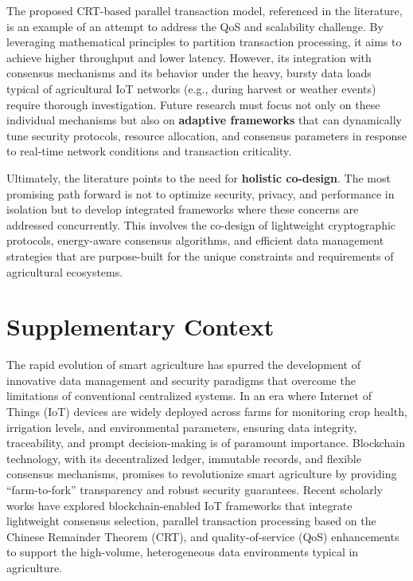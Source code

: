 \documentclass[12pt,onecolumn]{IEEEtran} %
\begin{document}
The proposed CRT-based parallel transaction model, referenced in the literature, is an example of an attempt to address the QoS and scalability challenge. By leveraging mathematical principles to partition transaction processing, it aims to achieve higher throughput and lower latency. However, its integration with consensus mechanisms and its behavior under the heavy, bursty data loads typical of agricultural IoT networks (e.g., during harvest or weather events) require thorough investigation. Future research must focus not only on these individual mechanisms but also on \textbf{adaptive frameworks} that can dynamically tune security protocols, resource allocation, and consensus parameters in response to real-time network conditions and transaction criticality.

Ultimately, the literature points to the need for \textbf{holistic co-design}. The most promising path forward is not to optimize security, privacy, and performance in isolation but to develop integrated frameworks where these concerns are addressed concurrently. This involves the co-design of lightweight cryptographic protocols, energy-aware consensus algorithms, and efficient data management strategies that are purpose-built for the unique constraints and requirements of agricultural ecosystems.


\section*{Supplementary Context}

The rapid evolution of smart agriculture has spurred the development of innovative data management and security paradigms that overcome the limitations of conventional centralized systems. In an era where Internet of Things (IoT) devices are widely deployed across farms for monitoring crop health, irrigation levels, and environmental parameters, ensuring data integrity, traceability, and prompt decision-making is of paramount importance. Blockchain technology, with its decentralized ledger, immutable records, and flexible consensus mechanisms, promises to revolutionize smart agriculture by providing ``farm-to-fork'' transparency and robust security guarantees. Recent scholarly works \cite{ali2022blockchainenabledarchitecture, aliyu2023blockchainbasedsmartfarm} have explored blockchain-enabled IoT frameworks that integrate lightweight consensus selection, parallel transaction processing based on the Chinese Remainder Theorem (CRT), and quality-of-service (QoS) enhancements to support the high-volume, heterogeneous data environments typical in agriculture.
\end{document}
